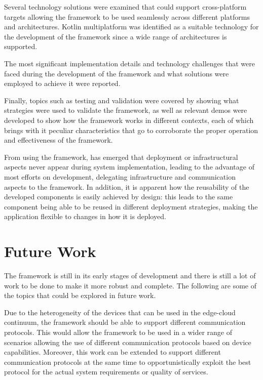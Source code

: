 Several technology solutions were examined that could support cross-platform targets allowing the framework to be used seamlessly across different
platforms and architectures. Kotlin multiplatform was identified as a suitable technology for the development of the framework since a wide
range of architectures is supported.

The most significant implementation details and technology challenges that were faced during the development of the framework and what solutions were
employed to achieve it were reported.

Finally, topics such as testing and validation were covered by showing what strategies were used to validate the framework, as well
as relevant demos were developed to show how the framework works in different contexts, each of which brings with it peculiar characteristics that
go to corroborate the proper operation and effectiveness of the framework.

From using the framework, has emerged that deployment or infrastructural aspects never appear during system implementation, leading to the advantage 
of most efforts on development, delegating infrastructure and communication aspects to the framework. In addition, it is apparent how the reusability
of the developed components is easily achieved by design: this leads to the same component being able to be reused in different deployment 
strategies, making the application flexible to changes in how it is deployed.

\section{Future Work}
\label{sec:future-work}

The framework is still in its early stages of development and there is still a lot of work to be done to make it more robust and complete. The
following are some of the topics that could be explored in future work.

Due to the heterogeneity of the devices that can be used in the edge-cloud continuum, the framework should be able to support different
communication protocols. This would allow the framework to be used in a wider range of scenarios allowing the use of different communication
protocols based on device capabilities. Moreover, this work can be extended to support different communication protocols at the same time to
opportunistically exploit the best protocol for the actual system requirements or quality of services.

